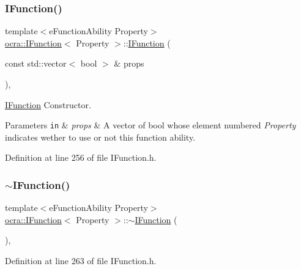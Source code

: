 \subsubsection{\texorpdfstring{I\+Function()}{IFunction()}}
{\footnotesize\ttfamily template$<$e\+Function\+Ability Property$>$ \\
\hyperlink{classocra_1_1IFunction}{ocra\+::\+I\+Function}$<$ Property $>$\+::\hyperlink{classocra_1_1IFunction}{I\+Function} (\begin{DoxyParamCaption}\item[{const std\+::vector$<$ bool $>$ \&}]{props }\end{DoxyParamCaption})\hspace{0.3cm}{\ttfamily [inline]}, {\ttfamily [protected]}}



\hyperlink{classocra_1_1IFunction}{I\+Function} Constructor. 


\begin{DoxyParams}[1]{Parameters}
\mbox{\tt in}  & {\em props} & A vector of bool whose element numbered {\itshape Property} indicates wether to use or not this function ability. \\
\hline
\end{DoxyParams}


Definition at line 256 of file I\+Function.\+h.

\hypertarget{classocra_1_1IFunction_a60204ea5f57d3f369915022c9e431e32}{}\label{classocra_1_1IFunction_a60204ea5f57d3f369915022c9e431e32} 
\subsubsection{\texorpdfstring{$\sim$\+I\+Function()}{~IFunction()}}
{\footnotesize\ttfamily template$<$e\+Function\+Ability Property$>$ \\
\hyperlink{classocra_1_1IFunction}{ocra\+::\+I\+Function}$<$ Property $>$\+::$\sim$\hyperlink{classocra_1_1IFunction}{I\+Function} (\begin{DoxyParamCaption}{ }\end{DoxyParamCaption})\hspace{0.3cm}{\ttfamily [inline]}, {\ttfamily [protected]}}



Definition at line 263 of file I\+Function.\+h.



